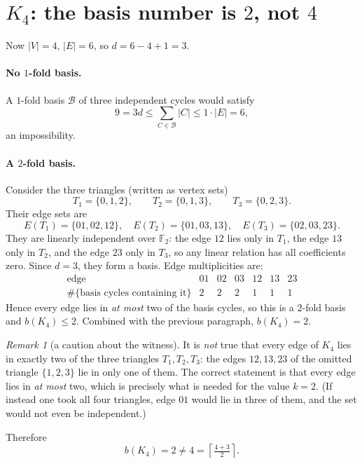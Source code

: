 \documentclass[11pt]{article}
\theoremstyle{definition}
\theoremstyle{remark}
\newtheorem{remark}[theorem]{Remark}
\newcommand{\F}{\mathbb{F}}
\newcommand{\ceil}[1]{\left\lceil #1 \right\rceil}
\begin{document}
\section{$K_4$: the basis number is $2$, not $4$}

Now $|V|=4$, $|E|=6$, so $d = 6-4+1 = 3$.

\paragraph{No $1$-fold basis.}
A $1$-fold basis $\mathcal{B}$ of three independent cycles would satisfy
\[
  9 = 3d \le \sum_{C\in\mathcal{B}}|C| \le 1\cdot |E| = 6,
\]
an impossibility.

\paragraph{A $2$-fold basis.}
Consider the three triangles (written as vertex sets)
\[
  T_1=\{0,1,2\},\qquad T_2=\{0,1,3\},\qquad T_3=\{0,2,3\}.
\]
Their edge sets are
\[
  E(T_1)=\{01,02,12\},\quad
  E(T_2)=\{01,03,13\},\quad
  E(T_3)=\{02,03,23\}.
\]
They are linearly independent over $\F_2$: the edge $12$ lies only in
$T_1$, the edge $13$ only in $T_2$, and the edge $23$ only in $T_3$, so any
linear relation has all coefficients zero. Since $d=3$, they form a basis. Edge
multiplicities are:
\[
  \begin{array}{c|cccccc}
    \text{edge} & 01 & 02 & 03 & 12 & 13 & 23\\ \hline
    \#\{\text{basis cycles containing it}\} & 2 & 2 & 2 & 1 & 1 & 1
  \end{array}
\]
Hence every edge lies in \emph{at most} two of the basis cycles, so this is a
$2$-fold basis and $b(K_4)\le 2$. Combined with the previous paragraph,
$b(K_4)=2$.

\begin{remark}[a caution about the witness]\label{rem:caution}
It is \emph{not} true that every edge of $K_4$ lies in exactly two of the three
triangles $T_1,T_2,T_3$: the edges $12,13,23$ of the omitted triangle
$\{1,2,3\}$ lie in only one of them. The correct statement is that every edge
lies in \emph{at most} two, which is precisely what is needed for the value
$k=2$. (If instead one took all four triangles, edge $01$ would lie in three of
them, and the set would not even be independent.)
\end{remark}

Therefore
\[
  b(K_4)=2 \neq 4 = \ceil{\tfrac{4+3}{2}}.
\]
\end{document}
